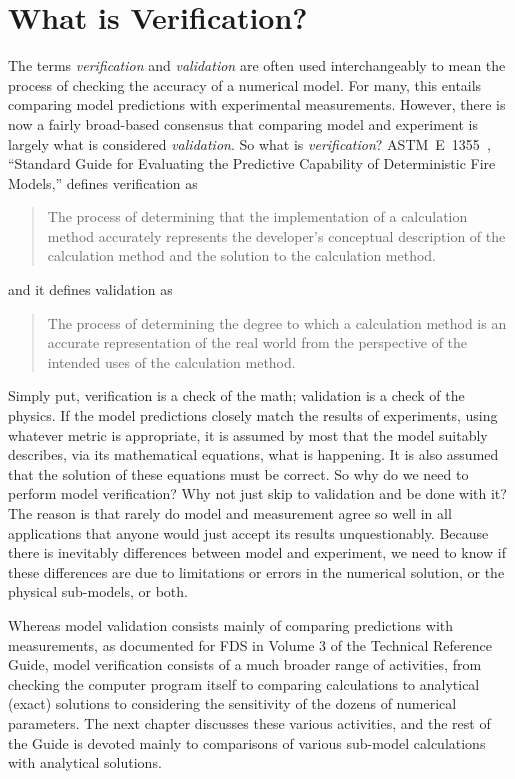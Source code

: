 \documentclass[11pt]{book}
\begin{document}
\tableofcontents

\mainmatter


\chapter{What is Verification?}

The terms {\em verification} and {\em validation} are often used interchangeably to mean the process of checking the
accuracy of a numerical model. For many, this entails comparing model predictions with experimental measurements. However,
there is now a fairly broad-based consensus that comparing model and experiment is largely what is considered {\em validation}. So what is
{\em verification}? ASTM~E~1355~\cite{ASTM:E1355}, ``Standard Guide for
Evaluating the Predictive Capability of Deterministic Fire Models,'' defines verification as
\begin{quote}
The process of determining that the implementation of a calculation method accurately
represents the developer's conceptual description of the calculation method and the solution to the calculation method.
\end{quote}
and it defines validation as
\begin{quote}
The process of determining the degree to which a calculation method is an accurate representation of the real world
from the perspective of the intended uses of the calculation method.
\end{quote}
Simply put, verification is a check of the math; validation is a check of the physics. If the model predictions closely match
the results of experiments, using whatever metric is appropriate, it is assumed by most that the model suitably describes, via
its mathematical equations, what is happening. It is also assumed that the solution of these equations must be correct. So why do
we need to perform model verification? Why not just skip to validation and be done with it? The reason is that rarely do model and
measurement agree so well in all applications that anyone would just accept its results unquestionably. Because there is
inevitably differences between model and experiment, we need to know if these differences are due to limitations or errors in
the numerical solution, or the physical sub-models, or both.

Whereas model validation consists mainly of comparing predictions with measurements, as documented for FDS in Volume 3 of the
Technical Reference Guide, model verification consists of a much broader range of activities, from checking the computer program
itself to comparing calculations to analytical (exact) solutions to considering the sensitivity of the dozens of numerical
parameters. The next chapter discusses these various activities, and the rest of the Guide is devoted mainly to comparisons of
various sub-model calculations with analytical solutions.
\end{document}
